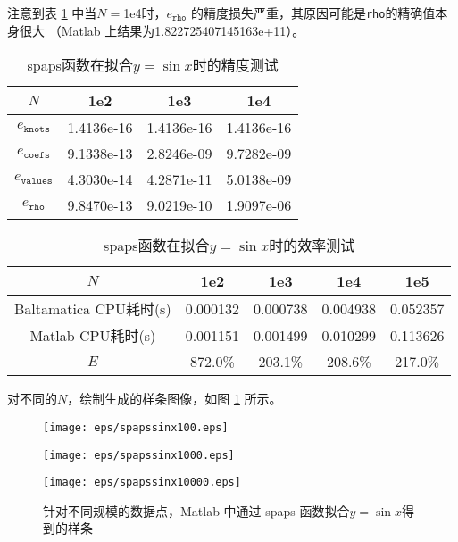 注意到表 \ref{tab:FINALspapssinxacc} 中当$N=$1e4时，$e_{\texttt{rho}}$
的精度损失严重，其原因可能是\texttt{rho}的精确值本身很大
（Matlab 上结果为1.822725407145163e+11）。

\begin{table}[htbp]
  \centering
  \caption{\label{tab:FINALspapssinxacc}spaps函数在拟合$y=\sin x$时的精度测试}
  \begin{tabular}{cccc}
    \hline
    $N$& 1e2 & 1e3 & 1e4\\
    \hline
    $e_{\texttt{knots}}$&1.4136e-16&1.4136e-16&1.4136e-16\\
    $e_{\texttt{coefs}}$&9.1338e-13& 2.8246e-09&9.7282e-09\\
    $e_{\texttt{values}}$&4.3030e-14&4.2871e-11&5.0138e-09\\
    $e_{\texttt{rho}}$&9.8470e-13&9.0219e-10& 1.9097e-06\\
    \hline
  \end{tabular}
\end{table}

\begin{table}[htbp]
  \centering
  \caption{\label{tab:FINALspapssinxtime}spaps函数在拟合$y=\sin x$时的效率测试}
  \begin{tabular}{ccccc}
    \hline
    $N$&1e2&1e3&1e4&1e5\\
    \hline
    Baltamatica CPU耗时(s)&0.000132&0.000738&0.004938&0.052357\\
    Matlab CPU耗时(s)&0.001151&0.001499&0.010299&0.113626\\
    $E$&872.0\%&203.1\%&208.6\%&217.0\%\\
    \hline
  \end{tabular}
\end{table}

对不同的$N$，绘制生成的样条图像，如图 \ref{fig:FINALspapssinx} 所示。

\begin{figure}[h]  
  \centering   
  \begin{minipage}{0.3\textwidth}  
    \centering  
    \texttt{[image: eps/spapssinx100.eps]}  
    \caption*{$N=100$}  
  \end{minipage}  
  \hfill  
  \begin{minipage}{0.3\textwidth}  
    \centering  
    \texttt{[image: eps/spapssinx1000.eps]}  
    \caption*{$N=1000$}  
  \end{minipage}
  \hfill  
  \begin{minipage}{0.3\textwidth}  
    \centering  
    \texttt{[image: eps/spapssinx10000.eps]}  
    \caption*{$N=10000$}  
  \end{minipage}   
  \caption{针对不同规模的数据点，Matlab 中通过 spaps 函数拟合$y=\sin x$得到的样条}
  \label{fig:FINALspapssinx}  
\end{figure}


